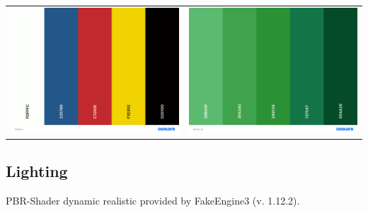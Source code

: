 \documentclass[10pt,a4paper]{article}
\begin{document}
\begin{tabular}{c c}
\includegraphics[scale=0.1]{boss_l}&\includegraphics[scale=0.1]{boss_w}\\


\end{tabular}
\subsection{Lighting}
PBR-Shader dynamic realistic provided by FakeEngine3 (v. 1.12.2). 
\end{document}
